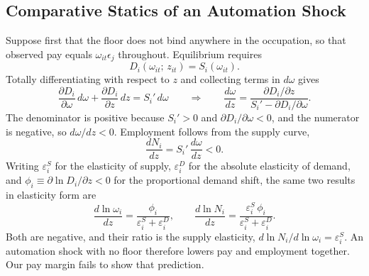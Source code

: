 \documentclass[12pt,leqno]{article}
\begin{document}
\subsection{Comparative Statics of an Automation Shock}

Suppose first that the floor does not bind anywhere in the occupation, so that observed pay equals $\omega_{it}\epsilon_j$ throughout. Equilibrium requires
\begin{equation}
D_i\!\left(\omega_{it};\, z_{it}\right) = S_i\!\left(\omega_{it}\right).
\end{equation}
Totally differentiating with respect to $z$ and collecting terms in $d\omega$ gives
\begin{equation}
\frac{\partial D_i}{\partial \omega}\, d\omega + \frac{\partial D_i}{\partial z}\, dz = S_i'\, d\omega
\qquad \Longrightarrow \qquad
\frac{d\omega}{dz} = \frac{\partial D_i / \partial z}{S_i' - \partial D_i / \partial \omega} .
\end{equation}
The denominator is positive because $S_i' > 0$ and $\partial D_i / \partial \omega < 0$, and the numerator is negative, so $d\omega / dz < 0$. Employment follows from the supply curve,
\begin{equation}
\frac{dN_i}{dz} = S_i'\, \frac{d\omega}{dz} < 0 .
\end{equation}
Writing $\varepsilon^{S}_i$ for the elasticity of supply, $\varepsilon^{D}_i$ for the absolute elasticity of demand, and $\phi_i \equiv \partial \ln D_i / \partial z < 0$ for the proportional demand shift, the same two results in elasticity form are
\begin{equation}\label{eq:elast}
\frac{d \ln \omega_i}{dz} = \frac{\phi_i}{\varepsilon^{S}_i + \varepsilon^{D}_i},
\qquad
\frac{d \ln N_i}{dz} = \frac{\varepsilon^{S}_i\, \phi_i}{\varepsilon^{S}_i + \varepsilon^{D}_i} .
\end{equation}
Both are negative, and their ratio is the supply elasticity, $d \ln N_i / d \ln \omega_i = \varepsilon^{S}_i$. An automation shock with no floor therefore lowers pay and employment together. Our pay margin fails to show that prediction.
\end{document}
